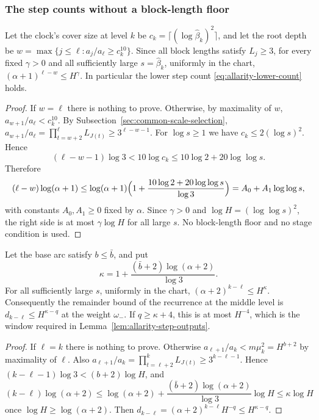 \subsubsection{The step counts without a block-length floor}
\label{subsec:allarity-lower-count}

\begin{lemma}
\label{lem:allarity-lower-count-free}
Let the clock's cover size at level $k$ be
$c_k=\lceil(\log\widehat\beta_k)^2\rceil$, and let the root depth be
$w=\max\{j\le\ell:a_j/a_\ell\ge c_k^{10}\}$. Since all block lengths
satisfy $L_j\ge3$, for every fixed $\gamma>0$ and all sufficiently large
$s=\widehat\beta_k$, uniformly in the chart,
$(\alpha+1)^{\ell-w}\le H^{\gamma}$. In particular the lower step count
\eqref{eq:allarity-lower-count} holds.
\end{lemma}
\begin{proof}
If $w=\ell$ there is nothing to prove. Otherwise, by maximality of $w$,
$a_{w+1}/a_\ell<c_k^{10}$. By Subsection~\ref{sec:common-scale-selection},
$a_{w+1}/a_\ell=\prod_{t=w+2}^{\ell}L_{J(t)}\ge3^{\ell-w-1}$. For
$\log s\ge1$ we have $c_k\le2(\log s)^2$. Hence
\[
 (\ell-w-1)\log3<10\log c_k\le10\log2+20\log\log s .
\]
Therefore
\[
 (\ell-w)\log(\alpha+1)\le\log(\alpha+1)
   \Bigl(1+\frac{10\log2+20\log\log s}{\log3}\Bigr)
 =A_0+A_1\log\log s ,
\]
with constants $A_0,A_1\ge0$ fixed by $\alpha$. Since $\gamma>0$ and
$\log H=(\log\log s)^2$, the right side is at most $\gamma\log H$ for all
large $s$. No block-length floor and no stage condition is used.
\end{proof}

\begin{lemma}
\label{lem:allarity-upper-count-power}
Let the base arc satisfy $b\le\bar b$, and put
\[
 \kappa=1+\frac{(\bar b+2)\log(\alpha+2)}{\log3}.
\]
For all sufficiently large $s$, uniformly in the chart,
$(\alpha+2)^{k-\ell}\le H^{\kappa}$. Consequently the remainder bound of
the recurrence at the middle level is $d_{k-\ell}\le H^{\kappa-q}$ at the
weight $\omega_-$. If $q\ge\kappa+4$, this is at most $H^{-4}$, which is
the window required in Lemma~\ref{lem:allarity-step-outputs}.
\end{lemma}
\begin{proof}
If $\ell=k$ there is nothing to prove. Otherwise
$a_{\ell+1}/a_k<m\mu_k^2=H^{b+2}$ by maximality of $\ell$. Also
$a_{\ell+1}/a_k=\prod_{t=\ell+2}^{k}L_{J(t)}\ge3^{k-\ell-1}$. Hence
$(k-\ell-1)\log3<(b+2)\log H$, and
\[
 (k-\ell)\log(\alpha+2)\le\log(\alpha+2)
   +\frac{(\bar b+2)\log(\alpha+2)}{\log3}\log H\le\kappa\log H
\]
once $\log H\ge\log(\alpha+2)$. Then
$d_{k-\ell}=(\alpha+2)^{k-\ell}H^{-q}\le H^{\kappa-q}$.
\end{proof}

